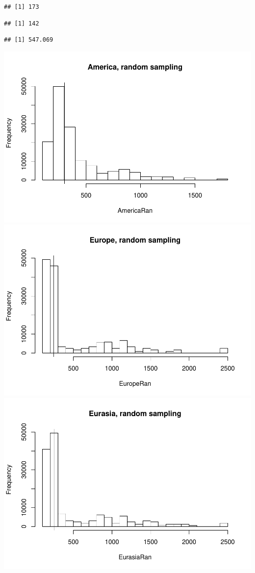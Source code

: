 \documentclass[]{article}
\begin{document}
\begin{verbatim}
## [1] 173
\end{verbatim}

\begin{verbatim}
## [1] 142
\end{verbatim}

\begin{verbatim}
## [1] 547.069
\end{verbatim}

\includegraphics{MA_JJ_files/figure-latex/RSCon-1.pdf}
\includegraphics{MA_JJ_files/figure-latex/RSCon-2.pdf}
\includegraphics{MA_JJ_files/figure-latex/RSCon-3.pdf}
\end{document}
